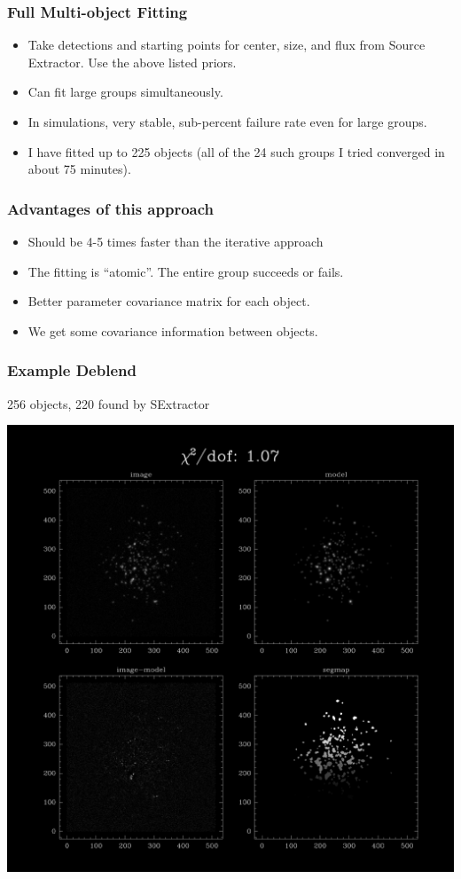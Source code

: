 \documentclass{beamer}
\begin{document}
\frame
{
    \frametitle{Full Multi-object Fitting}

    \begin{itemize}

        \item Take detections and starting points for
            center, size, and flux from Source Extractor.  Use the
            above listed priors.
            
        \item Can fit large groups simultaneously.

        \item In simulations, very stable, sub-percent failure rate
            even for large groups.

        \item I have fitted up to 225 objects (all of the 24 such groups I tried converged
            in about 75 minutes).


    \end{itemize}

}
\frame
{
    \frametitle{Advantages of this approach}

    \begin{itemize}

        \item Should be 4-5 times faster than the iterative approach

        \item The fitting is ``atomic''.  The entire group succeeds or fails.

        \item Better parameter covariance matrix for each object.

        \item We get some covariance information between objects.

    \end{itemize}
}

\frame
{
    \frametitle{Example Deblend}

        256 objects, 220 found by SExtractor
    \begin{center}
        \includegraphics[width=0.7\columnwidth]{diff-20855-000000.png}
    \end{center}
}
\end{document}
